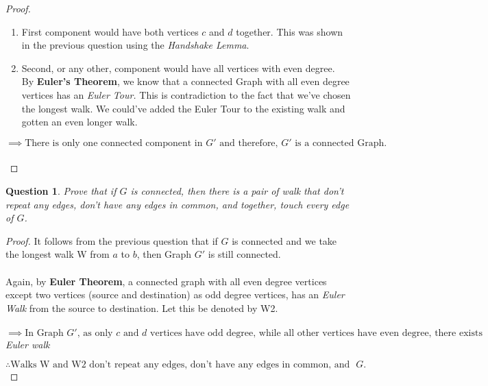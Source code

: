 \documentclass{article}
\newtheorem{question}{Question}
\begin{document}
\begin{proof}
\begin{enumerate}
    \item First component would have both vertices $c$ and $d$ together. This was shown in the previous question using the \textit{Handshake Lemma}.
    \item Second, or any other, component would have all vertices with even degree.\\
    By \textbf{Euler's Theorem}, we know that a connected Graph with all even degree vertices has an \textit{Euler Tour.} This is contradiction to the fact that we've chosen the longest walk. We could've added the Euler Tour to the existing walk and gotten an even longer walk.
    \end{enumerate}

    $\implies \text{There is only one connected component in $G'$ and therefore, $G'$ is a connected Graph.}$\\
    \\
\end{proof}
\pagebreak
\begin{question}
    Prove that if $G$ is connected, then there is a pair of walk that don’t repeat any edges, don’t have any edges in common, and together, touch every edge of $G$.
\end{question}
\begin{proof}
    It follows from the previous question that if $G$ is connected and we take the longest walk W from $a$ to $b$, then Graph $G'$ is still connected.
    \\ \\
    Again, by \textbf{Euler Theorem}, a connected graph with all even degree vertices except two vertices (source and destination) as odd degree vertices, has an \textit{Euler Walk} from the source to destination. Let this be denoted by W2.
    \\ \\
    $\implies \text{In Graph $G'$, as only $c$ and $d$ vertices have odd degree, while all other vertices have even degree, there exists an}$ \\ \textit{Euler walk} 
    
    $\therefore \text{Walks W and W2 don't repeat any edges, don't have any edges in common, and together, touch every edge of Graph $G$.}$
\end{proof}
\end{document}
